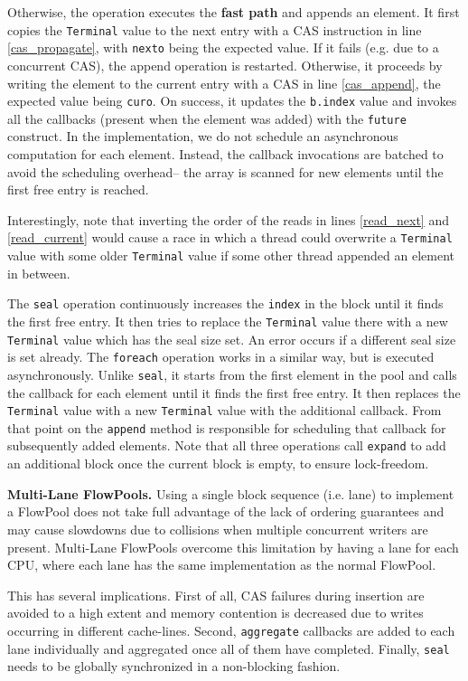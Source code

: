 Otherwise, the operation executes the \textbf{fast path} and appends
an element.
It first copies the \verb=Terminal= value to the next entry with a CAS
instruction in line \ref{cas_propagate}, with \verb=nexto= being the
expected value. If it fails (e.g. due to a concurrent CAS), the append
operation is restarted.
Otherwise, it proceeds by writing the element to the current entry with
a CAS in line \ref{cas_append}, the expected value being
\verb=curo=.
On success, it updates the \verb=b.index= value and invokes all
the callbacks (present when the element was added) with
the \verb=future= construct.
In the implementation, we do not schedule an asynchronous
computation for each element.
Instead, the callback invocations are batched to avoid the scheduling overhead--
the array is scanned for new elements
until the first free entry is reached.

Interestingly, note that inverting the order of the reads in lines
\ref{read_next} and \ref{read_current} would cause a race in which a
thread could overwrite a \verb=Terminal= value with some older
\verb=Terminal= value if some other thread appended an element in between.

The \verb=seal= operation continuously increases the \verb=index= in the block
until it finds the first free entry. It then tries to replace the \verb=Terminal=
value there with a new \verb=Terminal= value which has the seal size set.
An error occurs if a different seal size is set already. The \verb=foreach=
operation works in a similar way, but is executed asynchronously. Unlike
\verb=seal=, it starts from the first element in the pool and calls the
callback for each element until it finds the first free entry.
It then replaces the \verb=Terminal= value with a new \verb=Terminal=
value with the additional callback. From that point on the \verb=append=
method is responsible for scheduling that callback for subsequently added elements.
Note that all three operations call \verb=expand= to add an additional
block once the current block is empty, to ensure lock-freedom.

\textbf{Multi-Lane FlowPools.}
Using a single block sequence (i.e. lane) to implement a FlowPool
does not take full advantage of the lack of ordering guarantees
and may cause slowdowns due to
collisions when multiple concurrent writers are present. Multi-Lane
FlowPools overcome this limitation by having a lane for each CPU, where
each lane has the same implementation as the normal FlowPool.

This has several implications. First of all, CAS failures during
insertion are avoided to a high extent and memory contention is
decreased due to writes occurring in different cache-lines.
Second, \verb=aggregate= callbacks are added to each lane
individually and aggregated once all of them have completed.
Finally, \verb=seal= needs to be globally synchronized in a
non-blocking fashion.

